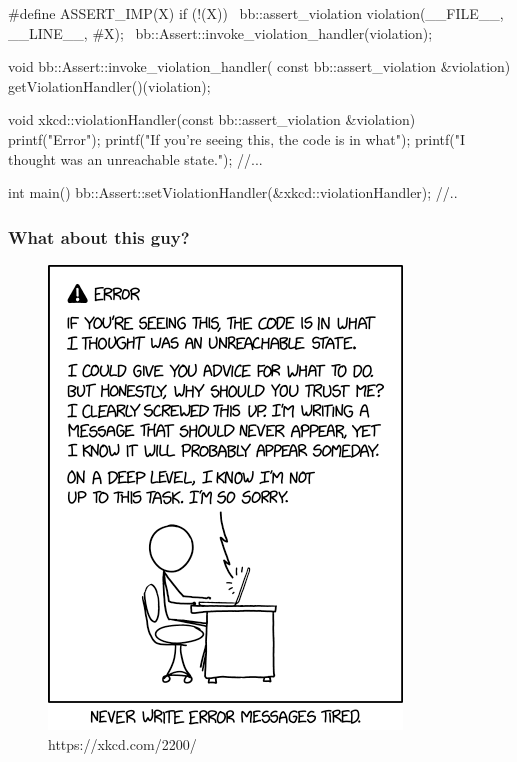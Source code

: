 \begin{frame}
\begin{overprint}
\begin{cppcodebox}
#define ASSERT_IMP(X) if (!(X)) {                                   \
    bb::assert_violation violation(__FILE__, __LINE__, #X);         \
    bb::Assert::invoke_violation_handler(violation);                \
}
\end{cppcodebox}

\begin{cppcodebox}
void bb::Assert::invoke_violation_handler(
                            const bb::assert_violation &violation) {
    getViolationHandler()(violation);
}
\end{cppcodebox}

\begin{cppcodebox}
void xkcd::violationHandler(const bb::assert_violation &violation) {
  printf("Error\n");
  printf("If you're seeing this, the code is in what\n");
  printf("I thought was an unreachable state.");
  //...
}
\end{cppcodebox}

\onslide<9>
\begin{cppcodebox}
  int main() {
    bb::Assert::setViolationHandler(&xkcd::violationHandler);
    //..
  }
\end{cppcodebox}

\end{overprint}
\end{frame}

\begin{frame}
  \frametitle{What about this guy?}
  \begin{figure}
    \includegraphics[height=0.9\textheight]{xkcdunreachablestate}
    \caption{https://xkcd.com/2200/}
  \end{figure}
\end{frame}

